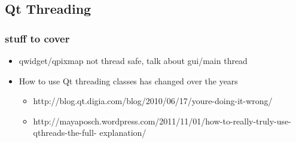%
%
%
%

\subsection{Qt Threading}


\begin{slide}
\frametitle{stuff to cover}
\begin{itemize}
\item qwidget/qpixmap not thread safe, talk about gui/main thread
\item How to use Qt threading classes has changed over the years
  \begin{itemize}
  \item http://blog.qt.digia.com/blog/2010/06/17/youre-doing-it-wrong/
  \item http://mayaposch.wordpress.com/2011/11/01/how-to-really-truly-use-qthreads-the-full-
explanation/
  \end{itemize}
\end{itemize}
\end{slide}
